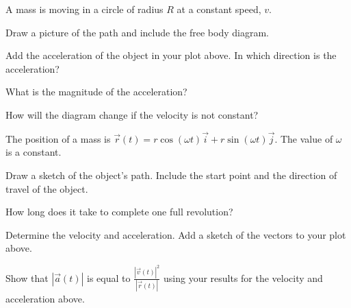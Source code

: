 \begin{problem}
\item A mass is moving in a circle of radius $R$ at a constant speed,
  $v$.
  \begin{subproblem}
  \item Draw a picture of the path and include the free body diagram.
    \vfill
  \item Add the acceleration of the object in your plot above. In
    which direction is the acceleration?
    \vfill
  \item What is the magnitude of the acceleration?
    \vfill
  \item How will the diagram change if the velocity is not constant?
    \vfill
  \end{subproblem}
\end{problem}


\begin{problem}
\item The position of a mass is
  $\vec{r}(t)=r\cos(\omega t)\vec{i}+r\sin(\omega t)\vec{j}$. The
  value of $\omega$ is a constant.
  \begin{subproblem}
  \item Draw a sketch of the object's path. Include the start point
    and the direction of travel of the object.
    \vfill
  \item How long does it take to complete one full revolution?
    \vspace{3em}
  \item Determine the velocity and acceleration. Add a sketch of the
    vectors to your plot above.
    \vfill
  \item Show that $|\vec{a}(t)|$ is equal to
    $\frac{|\vec{v}(t)|^2}{|\vec{r}(t)|}$ using your results for the
    velocity and acceleration above.
    \vfill
  \end{subproblem}
\end{problem}

